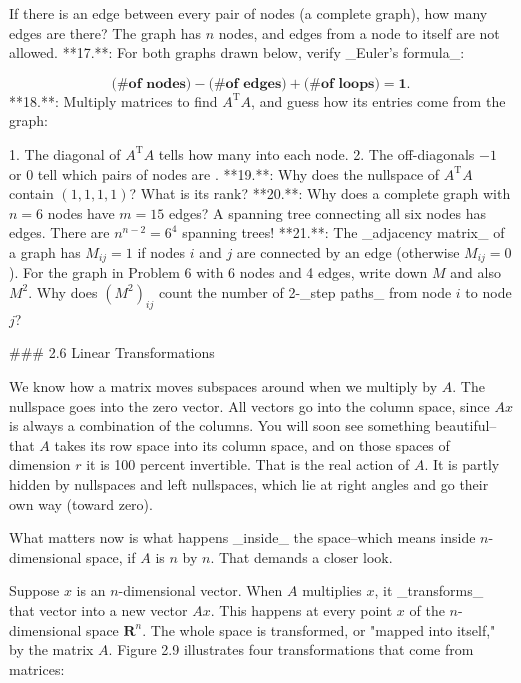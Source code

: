 If there is an edge between every pair of nodes (a complete graph), how many edges are there? The graph has \(n\) nodes, and edges from a node to itself are not allowed.
**17.**: For both graphs drawn below, verify _Euler's formula_:

\[\textbf{(\# of nodes)}-\textbf{(\# of edges)}+\textbf{(\# of loops)}=\textbf{1}.\]
**18.**: Multiply matrices to find \(A^{\mathrm{T}}A\), and guess how its entries come from the graph:

1. The diagonal of \(A^{\mathrm{T}}A\) tells how many into each node.
2. The off-diagonals \(-1\) or \(0\) tell which pairs of nodes are .
**19.**: Why does the nullspace of \(A^{\mathrm{T}}A\) contain \((1,1,1,1)\)? What is its rank?
**20.**: Why does a complete graph with \(n=6\) nodes have \(m=15\) edges? A spanning tree connecting all six nodes has edges. There are \(n^{n-2}=6^{4}\) spanning trees!
**21.**: The _adjacency matrix_ of a graph has \(M_{ij}=1\) if nodes \(i\) and \(j\) are connected by an edge (otherwise \(M_{ij}=0\)). For the graph in Problem 6 with 6 nodes and 4 edges, write down \(M\) and also \(M^{2}\). Why does \((M^{2})_{ij}\) count the number of 2-_step paths_ from node \(i\) to node \(j\)?

### 2.6 Linear Transformations

We know how a matrix moves subspaces around when we multiply by \(A\). The nullspace goes into the zero vector. All vectors go into the column space, since \(Ax\) is always a combination of the columns. You will soon see something beautiful--that \(A\) takes its row space into its column space, and on those spaces of dimension \(r\) it is 100 percent invertible. That is the real action of \(A\). It is partly hidden by nullspaces and left nullspaces, which lie at right angles and go their own way (toward zero).

What matters now is what happens _inside_ the space--which means inside \(n\)-dimensional space, if \(A\) is \(n\) by \(n\). That demands a closer look.

Suppose \(x\) is an \(n\)-dimensional vector. When \(A\) multiplies \(x\), it _transforms_ that vector into a new vector \(Ax\). This happens at every point \(x\) of the \(n\)-dimensional space \(\textbf{R}^{n}\). The whole space is transformed, or "mapped into itself," by the matrix \(A\). Figure 2.9 illustrates four transformations that come from matrices: 